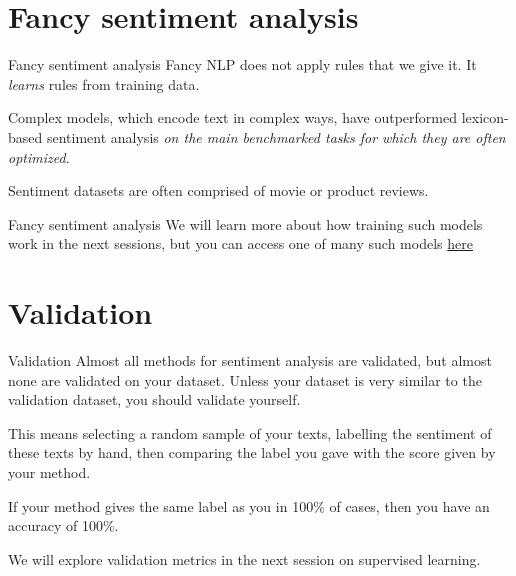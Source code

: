 \documentclass[
  10pt,
  ignorenonframetext,
  aspectratio=169]{beamer}
\begin{document}
\hypertarget{fancy-sentiment-analysis}{%
\section{Fancy sentiment analysis}\label{fancy-sentiment-analysis}}

\begin{frame}{Fancy sentiment analysis}
\protect\hypertarget{fancy-sentiment-analysis-1}{}
Fancy NLP does not apply rules that we give it. It \emph{learns} rules
from training data.

Complex models, which encode text in complex ways, have outperformed
lexicon-based sentiment analysis \emph{on the main benchmarked tasks for
which they are often optimized}.

Sentiment datasets are often comprised of movie or product reviews.
\end{frame}

\begin{frame}{Fancy sentiment analysis}
\protect\hypertarget{fancy-sentiment-analysis-2}{}
We will learn more about how training such models work in the next
sessions, but you can access one of many such models
\href{https://huggingface.co/cardiffnlp/twitter-roberta-base-sentiment}{here}
\end{frame}

\hypertarget{validation}{%
\section{Validation}\label{validation}}

\begin{frame}{Validation}
\protect\hypertarget{validation-1}{}
Almost all methods for sentiment analysis are validated, but almost none
are validated on your dataset. Unless your dataset is very similar to
the validation dataset, you should validate yourself.

This means selecting a random sample of your texts, labelling the
sentiment of these texts by hand, then comparing the label you gave with
the score given by your method.

If your method gives the same label as you in 100\% of cases, then you
have an accuracy of 100\%.

We will explore validation metrics in the next session on supervised
learning.
\end{frame}
\end{document}
